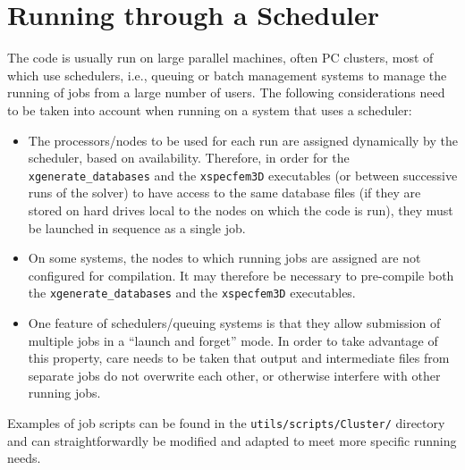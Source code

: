 \chapter{Running through a Scheduler}\label{cha:Scheduler}

The code is usually run on large parallel machines, often PC clusters,
most of which use schedulers, i.e., queuing or batch management systems
to manage the running of jobs from a large number of users. The following
considerations need to be taken into account when running on a system
that uses a scheduler:
\begin{itemize}
\item The processors/nodes to be used for each run are assigned dynamically
by the scheduler, based on availability. Therefore, in order for the
\texttt{xgenerate\_databases} and the \texttt{xspecfem3D} executables
(or between successive runs of the solver) to have access to the same
database files (if they are stored on hard drives local to the nodes
on which the code is run), they must be launched in sequence as a
single job.
\item On some systems, the nodes to which running jobs are assigned are
not configured for compilation. It may therefore be necessary to pre-compile
both the \texttt{xgenerate\_databases} and the \texttt{xspecfem3D}
executables.
\item One feature of schedulers/queuing systems is that they allow submission
of multiple jobs in a ``launch and forget'' mode. In order to take
advantage of this property, care needs to be taken that output and
intermediate files from separate jobs do not overwrite each other,
or otherwise interfere with other running jobs.
\end{itemize}
Examples of job scripts can be found in the \texttt{\small utils/scripts/Cluster/}{\small{}
directory and can straightforwardly be modified and adapted to meet
more specific running needs.}{\small \par}

